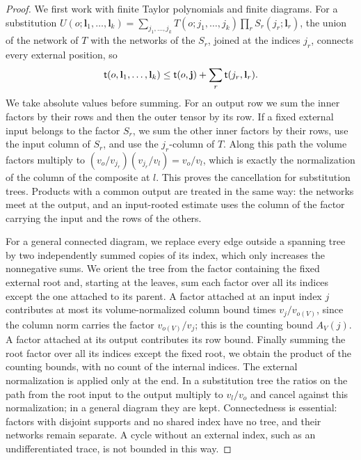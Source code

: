 \begin{proof}
We first work with finite Taylor polynomials and finite diagrams. For a substitution $U(o;\mathbf l_1,\ldots,\mathbf l_k)=\sum_{j_1,\ldots,j_k}T(o;j_1,\ldots,j_k)\prod_rS_r(j_r;\mathbf l_r)$, the union of the network of $T$ with the networks of the $S_r$, joined at the indices $j_r$, connects every external position, so
\[
 \mathsf t(o,\mathbf l_1,\ldots,\mathbf l_k)\le\mathsf t(o,\mathbf j)+\sum_r\mathsf t(j_r,\mathbf l_r).
\]
We take absolute values before summing. For an output row we sum the inner factors by their rows and then the outer tensor by its row. If a fixed external input belongs to the factor $S_r$, we sum the other inner factors by their rows, use the input column of $S_r$, and use the $j_r$-column of $T$. Along this path the volume factors multiply to $(v_o/v_{j_r})(v_{j_r}/v_l)=v_o/v_l$, which is exactly the normalization of the column of the composite at $l$. This proves the cancellation for substitution trees. Products with a common output are treated in the same way: the networks meet at the output, and an input-rooted estimate uses the column of the factor carrying the input and the rows of the others.

For a general connected diagram, we replace every edge outside a spanning tree by two independently summed copies of its index, which only increases the nonnegative sums. We orient the tree from the factor containing the fixed external root and, starting at the leaves, sum each factor over all its indices except the one attached to its parent. A factor attached at an input index $j$ contributes at most its volume-normalized column bound times $v_j/v_{o(V)}$, since the column norm carries the factor $v_{o(V)}/v_j$; this is the counting bound $A_V(j)$. A factor attached at its output contributes its row bound. Finally summing the root factor over all its indices except the fixed root, we obtain the product of the counting bounds, with no count of the internal indices. The external normalization is applied only at the end. In a substitution tree the ratios on the path from the root input to the output multiply to $v_l/v_o$ and cancel against this normalization; in a general diagram they are kept. Connectedness is essential: factors with disjoint supports and no shared index have no tree, and their networks remain separate. A cycle without an external index, such as an undifferentiated trace, is not bounded in this way.


\end{proof}
